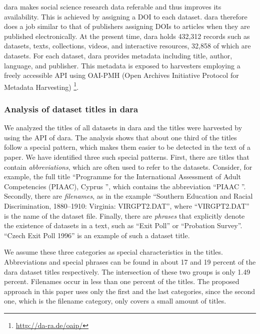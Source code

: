 \documentclass{IOS-Book-Article}
\newcommand{\dara}{\textsf{da\textbar ra}}
\begin{document}
{\dara} makes social science research data referable and thus improves its availability. 
This is achieved by assigning a DOI to each dataset. {\dara} therefore does a job similar to that of publishers assigning DOIs to articles when they are published electronically.
At the present time, {\dara} holds 432,312 records such as datasets, texts, collections, videos, and interactive resources, 32,858 of which are datasets. 
For each dataset, {\dara} provides metadata including title, author, language, and publisher. This metadata is exposed to harvesters employing a freely accessible API using OAI-PMH (Open Archives Initiative Protocol for Metadata Harvesting) \footnote{\url{http://da-ra.de/oaip/}}. 
  
  \subsubsection{Analysis of dataset titles in {\dara}}
We analyzed the titles of all datasets in {\dara} and the titles were harvested by using the API of {\dara}. The analysis shows that about one third of the titles follow a special pattern, which makes them easier to be detected in the text of a paper. We have identified three such special patterns. First, there are titles that contain \emph{abbreviations}, which are often used to refer to the datasets. 
Consider, for example, the full title \enquote{Programme for the International Assessment of Adult Competencies (PIAAC), Cyprus }, which contains the abbreviation \enquote{PIAAC }. Secondly, there are \emph{filenames}, as in the example \enquote{Southern Education and Racial Discrimination, 1880--1910: Virginia: VIRGPT2.DAT}, where \enquote{VIRGPT2.DAT} is the name of the dataset file. Finally, there are \emph{phrases} that explicitly denote the existence of datasets in a text, such as \enquote{Exit Poll} or \enquote{Probation Survey}. \enquote{Czech Exit Poll 1996} is an example of such a dataset title. 

We assume these three categories as special characteristics in the titles. Abbreviations and special phrases can be found in about 17 and 19 percent of the {\dara} dataset titles respectively. The intersection of these two groups is only 1.49 percent. Filenames occur in less than one percent of the titles. 
The proposed approach in this paper uses only the first and the last categories, since the second one, which is the filename category, only covers a small amount of titles.
\end{document}
